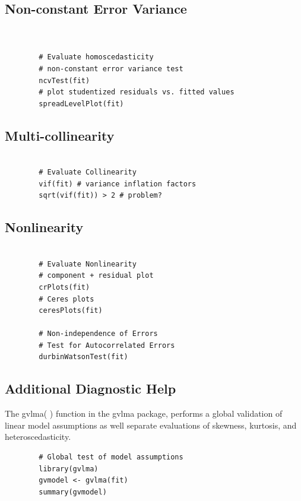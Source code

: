 \documentclass[residuals.tex]{subfiles}
\begin{document}
	\subsection*{Non-constant Error Variance}
	\begin{framed}
		\begin{verbatim}	
		
		
		# Evaluate homoscedasticity
		# non-constant error variance test
		ncvTest(fit)
		# plot studentized residuals vs. fitted values 
		spreadLevelPlot(fit)
		\end{verbatim}
	\end{framed}
	\subsection*{Multi-collinearity}
	\begin{framed}
		\begin{verbatim}
		
		# Evaluate Collinearity
		vif(fit) # variance inflation factors 
		sqrt(vif(fit)) > 2 # problem?
		\end{verbatim}
	\end{framed}
	\subsection{Nonlinearity}
	\begin{framed}
		\begin{verbatim}	
		
		# Evaluate Nonlinearity
		# component + residual plot 
		crPlots(fit)
		# Ceres plots 
		ceresPlots(fit)
		
		# Non-independence of Errors
		# Test for Autocorrelated Errors
		durbinWatsonTest(fit)
		\end{verbatim}
	\end{framed}
	\subsection{Additional Diagnostic Help}
	The gvlma( ) function in the gvlma package, performs a global validation of linear model assumptions as well separate evaluations of skewness, kurtosis, and heteroscedasticity.
	\begin{framed}
		\begin{verbatim}
		# Global test of model assumptions
		library(gvlma)
		gvmodel <- gvlma(fit) 
		summary(gvmodel)
		\end{verbatim}
	\end{framed}
	
\end{document}
